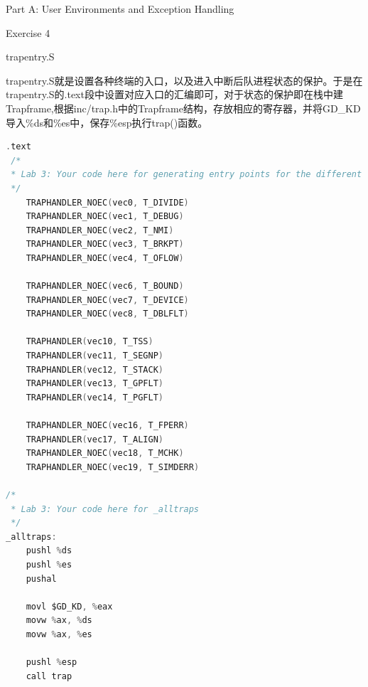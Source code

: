 \documentclass[GBK,winfonts,a4paper,10pt]{ctexart}
\begin{document}
\begin{section}{ Part A: User Environments and Exception Handling }
\begin{subsection}{ Exercise 4 }
\begin{subsubsection}{ trapentry.S }
\par
trapentry.S就是设置各种终端的入口，以及进入中断后队进程状态的保护。于是在trapentry.S的.text段中设置对应入口的汇编即可，对于状态的保护即在栈中建Trapframe,根据inc/trap.h中的Trapframe结构，存放相应的寄存器，并将GD\_KD导入\%ds和\%es中，保存\%esp执行trap()函数。
\begin{lstlisting}[language=C]
.text
 /*
 * Lab 3: Your code here for generating entry points for the different traps.
 */
 	TRAPHANDLER_NOEC(vec0, T_DIVIDE)
 	TRAPHANDLER_NOEC(vec1, T_DEBUG)
 	TRAPHANDLER_NOEC(vec2, T_NMI)
 	TRAPHANDLER_NOEC(vec3, T_BRKPT)
 	TRAPHANDLER_NOEC(vec4, T_OFLOW)

 	TRAPHANDLER_NOEC(vec6, T_BOUND)
	TRAPHANDLER_NOEC(vec7, T_DEVICE)
 	TRAPHANDLER_NOEC(vec8, T_DBLFLT)

 	TRAPHANDLER(vec10, T_TSS)
 	TRAPHANDLER(vec11, T_SEGNP)
 	TRAPHANDLER(vec12, T_STACK)
 	TRAPHANDLER(vec13, T_GPFLT)
 	TRAPHANDLER(vec14, T_PGFLT) 

 	TRAPHANDLER_NOEC(vec16, T_FPERR)
 	TRAPHANDLER(vec17, T_ALIGN)
 	TRAPHANDLER_NOEC(vec18, T_MCHK)
 	TRAPHANDLER_NOEC(vec19, T_SIMDERR)

/*
 * Lab 3: Your code here for _alltraps
 */
_alltraps:
	pushl %ds
	pushl %es
	pushal

	movl $GD_KD, %eax
	movw %ax, %ds
	movw %ax, %es

	pushl %esp
	call trap
\end{lstlisting}
\end{subsubsection}


\end{subsection}
\end{section}
\end{document}
